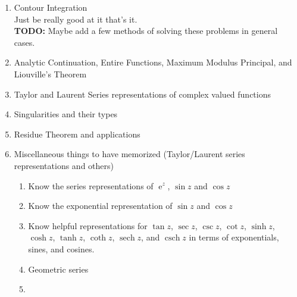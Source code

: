 \documentclass[10pt]{amsart}
\DeclareMathOperator{\E}{e}
\DeclareMathOperator{\sech}{sech}
\DeclareMathOperator{\csch}{csch}
\theoremstyle{nonumberplain}
\begin{document}
\begin{enumerate}[label={\bf {\arabic*}:}]
\item Contour Integration \\
Just be really good at it that's it. \\
\textbf{TODO: } Maybe add a few methods of solving these problems in general cases.\\

\item Analytic Continuation, Entire Functions, Maximum Modulus Principal, and Liouville's Theorem \\

\item Taylor and Laurent Series representations of complex valued functions \\

\item Singularities and their types \\

\item Residue Theorem and applications \\

\item Miscellaneous things to have memorized (Taylor/Laurent series representations and others)
\begin{enumerate}
\item Know the series representations of $\E^z$, $\sin z$ and $\cos z$
\item Know the exponential representation of $\sin z$ and $\cos z$
\item Know helpful representations for $\tan z$, $\sec z$, $\csc z$, $\cot z$, $\sinh z$, $\cosh z$, $\tanh z$, $\coth z$, $\sech z$, and $\csch z$ in terms of exponentials, sines, and cosines.
\item Geometric series
\item
\end{enumerate}

\end{enumerate}
\end{document}
